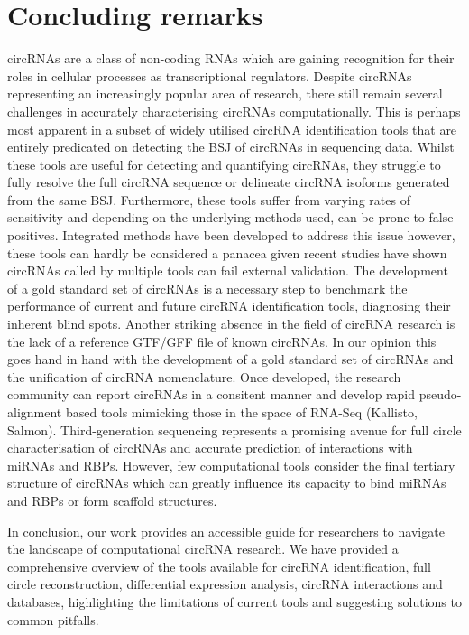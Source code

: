 \documentclass[pdflatex,sn-mathphys-num]{sn-jnl}
\begin{document}
\section{Concluding remarks}
circRNAs are a class of non-coding RNAs which are gaining recognition for their roles in cellular processes as transcriptional regulators. Despite circRNAs representing an increasingly popular area of research, there still remain several challenges in accurately characterising circRNAs computationally. This is perhaps most apparent in a subset of widely utilised circRNA identification tools that are entirely predicated on detecting the BSJ of circRNAs in sequencing data. Whilst these tools are useful for detecting and quantifying circRNAs, they struggle to fully resolve the full circRNA sequence or delineate circRNA isoforms generated from the same BSJ. Furthermore, these tools suffer from varying rates of sensitivity and depending on the underlying methods used, can be prone to false positives. Integrated methods have been developed to address this issue however, these tools can hardly be considered a panacea given recent studies have shown circRNAs called by multiple tools can fail external validation. The development of a gold standard set of circRNAs is a necessary step to benchmark the performance of current and future circRNA identification tools, diagnosing their inherent blind spots. Another striking absence in the field of circRNA research is the lack of a reference GTF/GFF file of known circRNAs. In our opinion this goes hand in hand with the development of a gold standard set of circRNAs and the unification of circRNA nomenclature. Once developed, the research community can report circRNAs in a consitent manner and develop rapid pseudo-alignment based tools mimicking those in the space of RNA-Seq (Kallisto\cite{kallisto}, Salmon\cite{Salmon}). Third-generation sequencing represents a promising avenue for full circle characterisation of circRNAs and accurate prediction of interactions with miRNAs and RBPs. However, few computational tools consider the final tertiary structure of circRNAs which can greatly influence its capacity to bind miRNAs and RBPs or form scaffold structures. \par
In conclusion, our work provides an accessible guide for researchers to navigate the landscape of computational circRNA research. We have provided a comprehensive overview of the tools available for circRNA identification, full circle reconstruction, differential expression analysis, circRNA interactions and databases, highlighting the limitations of current tools and suggesting solutions to common pitfalls. 
\end{document}
